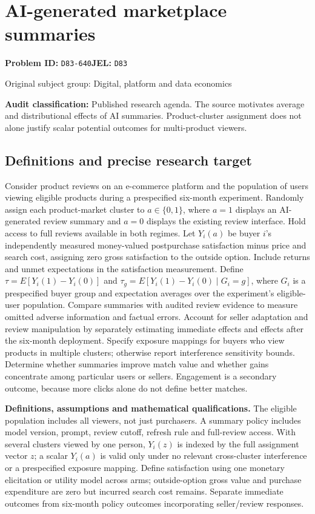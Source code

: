 \documentclass[11pt,a4paper]{article}
\begin{document}
\section*{AI-generated marketplace summaries}
\textbf{Problem ID:} \texttt{D83-640}\quad \textbf{JEL:} \texttt{D83}\par
\label{problem:OP-0403}
{\sffamily\small\color{muted}Original subject group: Digital, platform and data economics\par}
\label{definitions:problem:30007685}
\textbf{Audit classification:} Published research agenda. The source motivates average and distributional effects of AI summaries. Product-cluster assignment does not alone justify scalar potential outcomes for multi-product viewers.
\subsection*{Definitions and precise research target}
Consider product reviews on an e-commerce platform and the population of users viewing eligible products during a prespecified six-month experiment. Randomly assign each product-market cluster to \(a\in\{0,1\}\), where \(a=1\) displays an AI-generated review summary and \(a=0\) displays the existing review interface. Hold access to full reviews available in both regimes. Let \(Y_i(a)\) be buyer \(i\)'s independently measured money-valued postpurchase satisfaction minus price and search cost, assigning zero gross satisfaction to the outside option. Include returns and unmet expectations in the satisfaction measurement. Define \(\tau=E[Y_i(1)-Y_i(0)]\) and \(\tau_g=E[Y_i(1)-Y_i(0)\mid G_i=g]\), where \(G_i\) is a prespecified buyer group and expectation averages over the experiment's eligible-user population. Compare summaries with audited review evidence to measure omitted adverse information and factual errors. Account for seller adaptation and review manipulation by separately estimating immediate effects and effects after the six-month deployment. Specify exposure mappings for buyers who view products in multiple clusters; otherwise report interference sensitivity bounds. Determine whether summaries improve match value and whether gains concentrate among particular users or sellers. Engagement is a secondary outcome, because more clicks alone do not define better matches.

\textbf{Definitions, assumptions and mathematical qualifications.} The eligible population includes all viewers, not just purchasers. A summary policy includes model version, prompt, review cutoff, refresh rule and full-review access. With several clusters viewed by one person, \(Y_i(z)\) is indexed by the full assignment vector \(z\); a scalar \(Y_i(a)\) is valid only under no relevant cross-cluster interference or a prespecified exposure mapping. Define satisfaction using one monetary elicitation or utility model across arms; outside-option gross value and purchase expenditure are zero but incurred search cost remains. Separate immediate outcomes from six-month policy outcomes incorporating seller/review responses.
\end{document}

